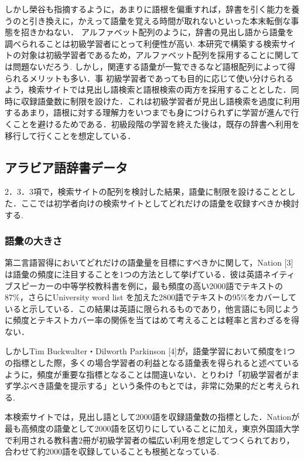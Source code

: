 \documentclass[technicalreport]{ieicej}
\begin{document}
しかし榮谷\cite{sakaedani2008}も指摘するように，あまりに語根を偏重すれば，辞書を引く能力を養うのと引き換えに，かえって語彙を覚える時間が取れないといった本末転倒な事態を招きかねない．
アルファベット配列のように，辞書の見出し語から語彙を調べられることは初級学習者にとって利便性が高い.
本研究で構築する検索サイトの対象は初級学習者であるため，アルファベット配列を採用することに関しては問題ないだろう.
しかし，関連する語彙が一覧できるなど語根配列によって得られるメリットも多い．事 初級学習者であっても目的に応じて使い分けられるよう，検索サイトでは見出し語検索と語根検索の両方を採用することとした．同時に収録語彙数に制限を設けた．これは初級学習者が見出し語検索を過度に利用するあまり，語根に対する理解力をいつまでも身につけられずに学習が進んで行くことを避けるためである．初級段階の学習を終えた後は，既存の辞書へ利用を移行して行くことを想定している．

\subsection{アラビア語辞書データ}
2．3．3項で，検索サイトの配列を検討した結果，語彙に制限を設けることとした．ここでは初学者向けの検索サイトとしてどれだけの語彙を収録すべきか検討する.

\subsubsection{語彙の大きさ}
第二言語習得においてどれだけの語彙量を目標にすべきかに関して，Nation [3]は語彙の頻度に注目することを1つの方法として挙げている．彼は英語ネイティブスピーカーの中等学校教科書を例に，最も頻度の高い2000語でテキストの87\%，さらにUniversity word list を加えた2800語でテキストの95\%をカバーしていると示している．この結果は英語に限られるものであり，他言語にも同じように頻度とテキストカバー率の関係を当てはめて考えることは軽率と言わざるを得ない．

しかしTim Buckwalter・Dilworth Parkinson [4]が，語彙学習において頻度を1つの指標とした際，多くの場合学習者の利益となる語彙表を得られると述べているように，頻度が重要な指標となることは間違いない．とりわけ「初級学習者がまず学ぶべき語彙を提示する」という条件のもとでは，非常に効果的だと考えられる.

本検索サイトでは，見出し語として2000語を収録語彙数の指標とした．Nationが最も高頻度の語彙として2000語を区切りにしていることに加え，東京外国語大学で利用される教科書2冊が初級学習者の幅広い利用を想定してつくられており，合わせて約2000語を収録していることも根拠となっている.
\end{document}

